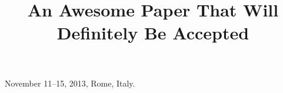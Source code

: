 


\date{}




\author{
}

\title{An Awesome Paper That Will Definitely Be Accepted}

 {November 11--15, 2013, Rome, Italy.}

\maketitle




\balance




